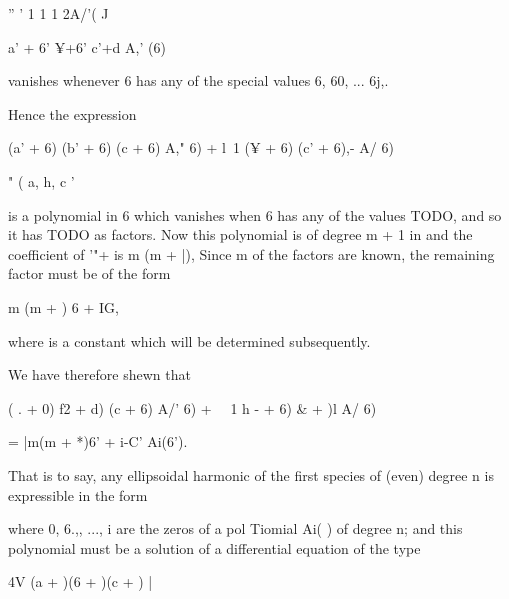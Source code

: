 '' ' 1 1 1 2A/'( J

a' + 6' ¥+6' c'+d A,' (6)

vanishes whenever 6 has any of the special values 6, 60, ... 6j,.

Hence the expression

(a' + 6) (b' + 6) (c + 6) A," 6) + l\ 1 (¥ + 6) (c' + 6),- A/ 6)

" ( a, h, c '

%
%

is a polynomial in 6 which vanishes when 6 has any of the values
TODO, and so it has TODO as factors. Now this
polynomial is of degree m + 1 in and the coefficient of '"+ is m (m +
|), Since m of the factors are known, the remaining factor must be of
the form

m (m + ) 6 + IG,

where is a constant which will be determined subsequently.

We have therefore shewn that

( . + 0) f2 + d) (c + 6) A/' 6) + \ \ 1 h - + 6) \& + )l A/ 6)

= |m(m + *)6' + i-C' Ai(6').

That is to say, any ellipsoidal harmonic of the first species of
(even) degree n is expressible in the form

where 0, 6.,, ..., i are the zeros of a pol Tiomial Ai( ) of degree
n; and this polynomial must be a solution of a differential equation
of the type

4V (a + )(6 + )(c + ) |

